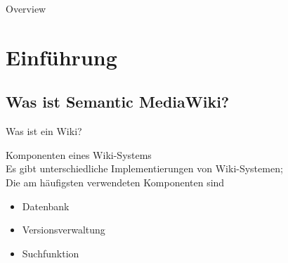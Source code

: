 \documentclass[aspectratio=1610,onlymath]{beamer}
\begin{document}
\maketitle


\begin{frame}{Overview}
\tableofcontents
\end{frame}



%
%

\section{Einführung}
\subsection{Was ist Semantic MediaWiki? } %
\label{sub:was_ist_semantic_mediawiki}



\begin{frame}{Was ist ein Wiki?}
	
	
	\vspace{2em}
	\alert{Komponenten eines Wiki-Systems}\\[1em]
	Es gibt unterschiedliche Implementierungen von Wiki-Systemen; \\
	Die am häufigsten verwendeten Komponenten sind
	\begin{itemize}
		\item Datenbank
		\item Versionsverwaltung
		\item Suchfunktion
	\end{itemize}

\end{frame}
\end{document}
